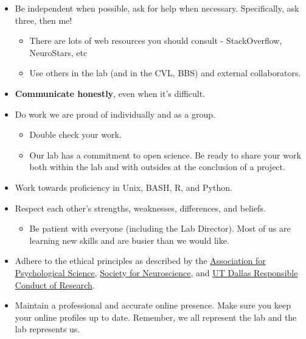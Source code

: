 \documentclass[]{book}
\providecommand{\tightlist}{%
  \setlength{\itemsep}{0pt}\setlength{\parskip}{0pt}}
\begin{document}
\begin{itemize}
\tightlist
\item
  Be independent when possible, ask for help when necessary. Specifically, ask three, then me!

  \begin{itemize}
  \tightlist
  \item
    There are lots of web resources you should consult - StackOverflow, NeuroStars, etc\\
  \item
    Use others in the lab (and in the CVL, BBS) and external collaborators.\\
  \end{itemize}
\item
  \textbf{Communicate honestly}, even when it's difficult.\\
\item
  Do work we are proud of individually and as a group.

  \begin{itemize}
  \tightlist
  \item
    Double check your work.\\
  \item
    Our lab has a commitment to open science. Be ready to share your work both within the lab and with outsides at the conclusion of a project.
  \end{itemize}
\item
  Work towards proficiency in Unix, BASH, R, and Python.
\item
  Respect each other's strengths, weaknesses, differences, and beliefs.

  \begin{itemize}
  \tightlist
  \item
    Be patient with everyone (including the Lab Director). Most of us are learning new skills and are busier than we would like.
  \end{itemize}
\item
  Adhere to the ethical principles as described by the \href{https://www.apa.org/ethics/code/}{Association for Psychological Science}, \href{https://www.sfn.org/Membership/Professional-Conduct/SfN-Ethics-Policy}{Society for Neuroscience}, and \href{https://research.utdallas.edu/orio/rcr}{UT Dallas Responsible Conduct of Research}.
\item
  Maintain a professional and accurate online presence. Make sure you keep your online profiles up to date. Remember, we all represent the lab and the lab represents us.
\end{itemize}
\end{document}
